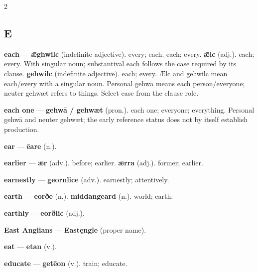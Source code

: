 \begin{multicols}{2}
\subsection*{E}
\textbf{each} — \textbf{ǣghwilc} (indefinite adjective). every; each. each; every. \textbf{ǣlc} (adj.). each; every. With singular noun; substantival each follows the case required by its clause. \textbf{gehwilc} (indefinite adjective). each; every. Ǣlc and gehwilc mean each/every with a singular noun. Personal gehwā means each person/everyone; neuter gehwæt refers to things. Select case from the clause role.\par
\textbf{each one} — \textbf{gehwā / gehwæt} (pron.). each one; everyone; everything. Personal gehwā and neuter gehwæt; the early reference status does not by itself establish production.\par
\textbf{ear} — \textbf{ēare} (n.).\par
\textbf{earlier} — \textbf{ǣr} (adv.). before; earlier. \textbf{ǣrra} (adj.). former; earlier.\par
\textbf{earnestly} — \textbf{geornlice} (adv.). earnestly; attentively.\par
\textbf{earth} — \textbf{eorðe} (n.).  \textbf{middangeard} (n.). world; earth.\par
\textbf{earthly} — \textbf{eorðlic} (adj.).\par
\textbf{East Anglians} — \textbf{Eastęngle} (proper name).\par
\textbf{eat} — \textbf{etan} (v.).\par
\textbf{educate} — \textbf{getēon} (v.). train; educate.\par

\end{multicols}
